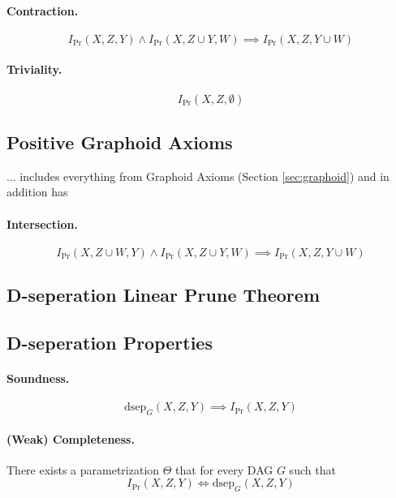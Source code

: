 \documentclass[11pt]{article}
\newcommand{\pr}{\mathrm{Pr}}
\newcommand{\dsep}{\mathrm{dsep}}
\begin{document}
\paragraph{Contraction.}
\begin{equation}
	I_\pr (X, Z, Y) \land I_\pr (X, Z \cup Y, W ) \implies I_\pr (X, Z, Y \cup W )
\end{equation}

\paragraph{Triviality.}
\begin{equation}
	I_\pr (X, Z, \emptyset) 
\end{equation}

\subsection{Positive Graphoid Axioms}
... includes everything from Graphoid Axioms (Section \ref{sec:graphoid}) and in addition has 
\paragraph{Intersection.}
\begin{equation}
	I _ \pr (X, Z \cup W, Y ) \land I _\pr (X, Z \cup Y , W ) \implies I _\pr (X, Z, Y \cup W)
\end{equation}

\subsection{D-seperation Linear Prune Theorem}

\subsection{D-seperation Properties}
\paragraph{Soundness.} 
\begin{equation}
	\dsep_ G ( X, Z, Y ) \implies I _\pr (X, Z, Y)
\end{equation}

\paragraph{(Weak) Completeness.}
There exists a parametrization $\Theta$ that for every DAG $G$ such that
\begin{equation}
	I_\pr (X, Z, Y) \iff \dsep_G (X, Z, Y)
\end{equation}
\end{document}

